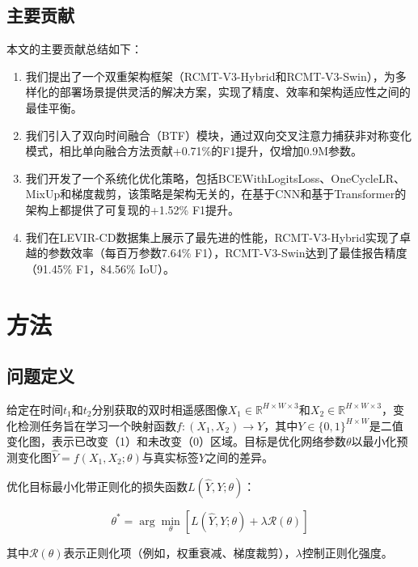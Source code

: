 \documentclass[journal]{IEEEtran}
\begin{document}
\subsection{主要贡献}

本文的主要贡献总结如下：

\begin{enumerate}
\item 我们提出了一个双重架构框架（RCMT-V3-Hybrid和RCMT-V3-Swin），为多样化的部署场景提供灵活的解决方案，实现了精度、效率和架构适应性之间的最佳平衡。

\item 我们引入了双向时间融合（BTF）模块，通过双向交叉注意力捕获非对称变化模式，相比单向融合方法贡献+0.71\%的F1提升，仅增加0.9M参数。

\item 我们开发了一个系统化优化策略，包括BCEWithLogitsLoss、OneCycleLR、MixUp和梯度裁剪，该策略是架构无关的，在基于CNN和基于Transformer的架构上都提供了可复现的+1.52\% F1提升。

\item 我们在LEVIR-CD数据集上展示了最先进的性能，RCMT-V3-Hybrid实现了卓越的参数效率（每百万参数7.64\% F1），RCMT-V3-Swin达到了最佳报告精度（91.45\% F1，84.56\% IoU）。
\end{enumerate}

\section{方法}

\subsection{问题定义}

给定在时间$t_1$和$t_2$分别获取的双时相遥感图像$X_1 \in \mathbb{R}^{H \times W \times 3}$和$X_2 \in \mathbb{R}^{H \times W \times 3}$，变化检测任务旨在学习一个映射函数$f: (X_1, X_2) \rightarrow Y$，其中$Y \in \{0,1\}^{H \times W}$是二值变化图，表示已改变（1）和未改变（0）区域。目标是优化网络参数$\theta$以最小化预测变化图$\hat{Y} = f(X_1, X_2; \theta)$与真实标签$Y$之间的差异。

优化目标最小化带正则化的损失函数$L(\hat{Y}, Y; \theta)$：

\begin{equation}
\theta^* = \arg\min_\theta \left[ L(\hat{Y}, Y; \theta) + \lambda \mathcal{R}(\theta) \right]
\label{eq:objective}
\end{equation}

其中$\mathcal{R}(\theta)$表示正则化项（例如，权重衰减、梯度裁剪），$\lambda$控制正则化强度。
\end{document}
